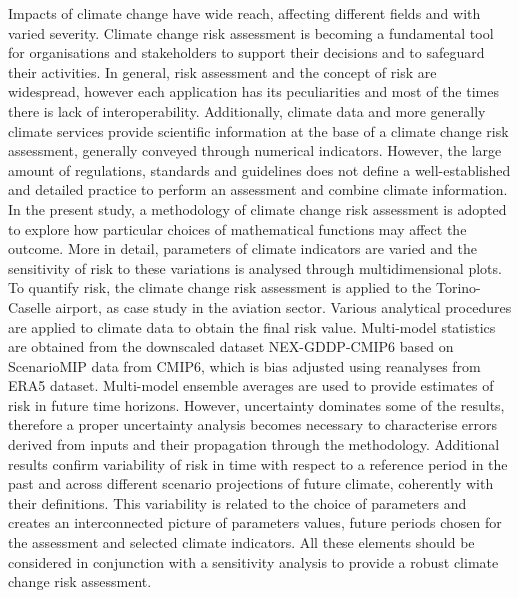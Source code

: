 Impacts of climate change have wide reach, affecting different fields and with varied severity. Climate change risk assessment is becoming a fundamental tool for organisations and stakeholders to support their decisions and to safeguard their activities. In general, risk assessment and the concept of risk are widespread, however each application has its peculiarities and most of the times there is lack of interoperability. Additionally, climate data and more generally climate services provide scientific information at the base of a climate change risk assessment, generally conveyed through numerical indicators. However, the large amount of regulations, standards and guidelines does not define a well-established and detailed practice to perform an assessment and combine climate information.
In the present study, a methodology of climate change risk assessment is adopted to explore how particular choices of mathematical functions may affect the outcome. More in detail, parameters of climate indicators are varied and the sensitivity of risk to these variations is analysed through multidimensional plots.
To quantify risk, the climate change risk assessment is applied to the Torino-Caselle airport, as case study in the aviation sector. Various analytical procedures are applied to climate data to obtain the final risk value. Multi-model statistics are obtained from the downscaled dataset NEX-GDDP-CMIP6 based on ScenarioMIP data from CMIP6, which is bias adjusted using reanalyses from ERA5 dataset. Multi-model ensemble averages are used to provide estimates of risk in future time horizons. However, uncertainty dominates some of the results, therefore a proper uncertainty analysis becomes necessary to characterise errors derived from inputs and their propagation through the methodology.
Additional results confirm variability of risk in time with respect to a reference period in the past and across different scenario projections of future climate, coherently with their definitions. This variability is related to the choice of parameters and creates an interconnected picture of parameters values, future periods chosen for the assessment and selected climate indicators. All these elements should be considered in conjunction with a sensitivity analysis to provide a robust climate change risk assessment.
